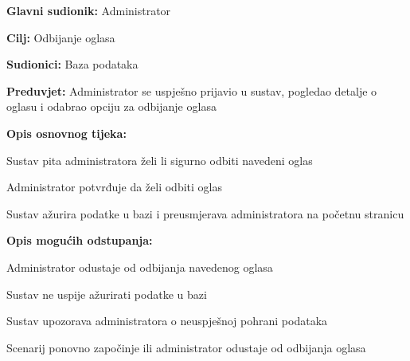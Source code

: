 					\noindent {}
					\begin{packed_item}
	
						\item \textbf{Glavni sudionik: }Administrator
						\item  \textbf{Cilj:} Odbijanje oglasa
						\item  \textbf{Sudionici:} Baza podataka
						\item  \textbf{Preduvjet:} Administrator se uspješno prijavio u sustav, pogledao detalje o oglasu i odabrao opciju za odbijanje oglasa
						\item  \textbf{Opis osnovnog tijeka:}
						
						\item[] \begin{packed_enum}
							\item Sustav pita administratora želi li sigurno odbiti navedeni oglas
							\item Administrator potvrđuje da želi odbiti oglas
							\item Sustav ažurira podatke u bazi i preusmjerava administratora na početnu stranicu
						\end{packed_enum}

						\item  \textbf{Opis mogućih odstupanja:}

						\item[] \begin{packed_item}
							\item[2.a] Administrator odustaje od odbijanja navedenog oglasa
							\item[3.a] Sustav ne uspije ažurirati podatke u bazi
							\item[] \begin{packed_enum}
								\item Sustav upozorava administratora o neuspješnoj pohrani podataka
								\item Scenarij ponovno započinje ili administrator odustaje od odbijanja oglasa
							\end{packed_enum}					
						\end{packed_item}
					\end{packed_item}

					\eject

